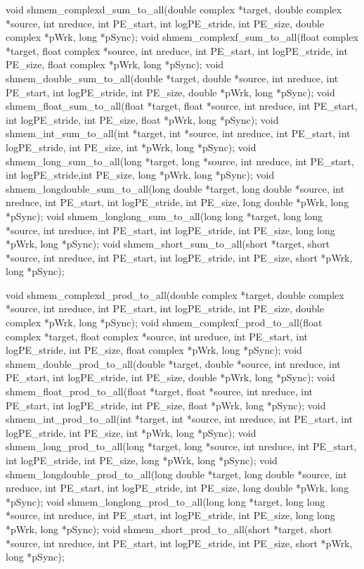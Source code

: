 void shmem_complexd_sum_to_all(double complex *target, double complex *source, int nreduce, int PE_start, int logPE_stride, int PE_size, double complex *pWrk, long *pSync);
void shmem_complexf_sum_to_all(float complex *target, float complex *source, int nreduce, int PE_start, int logPE_stride, int PE_size, float complex *pWrk, long *pSync);
void shmem_double_sum_to_all(double *target, double *source, int nreduce, int PE_start, int logPE_stride, int PE_size, double *pWrk, long *pSync);
void shmem_float_sum_to_all(float *target, float *source, int nreduce, int PE_start, int logPE_stride, int PE_size, float *pWrk, long *pSync);
void shmem_int_sum_to_all(int *target, int *source, int nreduce, int PE_start, int logPE_stride, int PE_size, int *pWrk, long *pSync);
void shmem_long_sum_to_all(long *target, long *source, int nreduce, int PE_start, int logPE_stride,int PE_size, long *pWrk, long *pSync);
void shmem_longdouble_sum_to_all(long double *target, long double *source, int nreduce, int PE_start, int logPE_stride, int PE_size, long double *pWrk, long *pSync);
void shmem_longlong_sum_to_all(long long *target, long long *source, int nreduce, int PE_start, int logPE_stride, int PE_size, long long *pWrk, long *pSync);
void shmem_short_sum_to_all(short *target, short *source, int nreduce, int PE_start, int logPE_stride, int PE_size, short *pWrk, long *pSync);


void shmem_complexd_prod_to_all(double complex *target, double complex *source, int nreduce, int PE_start, int logPE_stride, int PE_size, double complex *pWrk, long *pSync);
void shmem_complexf_prod_to_all(float complex *target, float complex *source, int nreduce, int PE_start, int logPE_stride, int PE_size, float complex *pWrk, long *pSync);
void shmem_double_prod_to_all(double *target, double *source, int nreduce, int PE_start, int logPE_stride, int PE_size, double *pWrk, long *pSync);
void shmem_float_prod_to_all(float *target, float *source, int nreduce, int PE_start, int logPE_stride, int PE_size, float *pWrk, long *pSync);
void	shmem_int_prod_to_all(int *target, int *source, int nreduce, int PE_start, int logPE_stride, int PE_size, int *pWrk, long *pSync);
void shmem_long_prod_to_all(long *target, long *source, int nreduce, int PE_start, int logPE_stride, int PE_size, long *pWrk, long *pSync);
void shmem_longdouble_prod_to_all(long double *target, long double *source, int nreduce, int PE_start, int logPE_stride, int PE_size, long double *pWrk, long *pSync);
void shmem_longlong_prod_to_all(long long *target, long long *source, int nreduce, int PE_start, int logPE_stride,	 int PE_size, long long *pWrk, long *pSync);
void shmem_short_prod_to_all(short	*target, short *source, int nreduce, int PE_start, int logPE_stride, int PE_size, short *pWrk, long *pSync);


